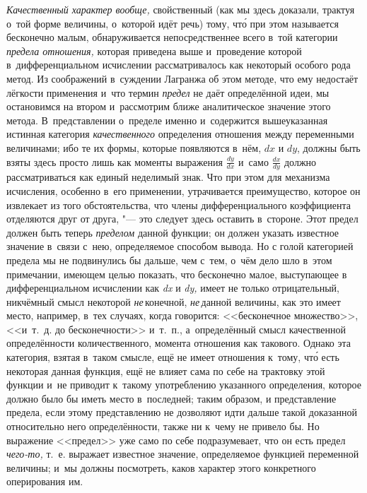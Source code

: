 {\em Качественный характер вообще,} свойственный (как мы здесь доказали,
трактуя о~той форме величины, о~которой идёт речь) тому, чт\'{о} при этом
называется бесконечно малым, обнаруживается непосредственнее всего в~той
категории {\em предела отношения,} которая приведена выше и~проведение которой
в~дифференциальном исчислении рассматривалось как некоторый особого рода метод.
Из соображений в~суждении Лагранжа об этом методе, что ему недостаёт лёгкости
применения и~что термин {\em предел} не даёт определённой идеи, мы
остановимся на втором и~рассмотрим ближе аналитическое значение этого метода.
В~представлении о~пределе именно и~содержится вышеуказанная истинная категория
{\em качественного} определения отношения между переменными величинами; ибо те
их формы, которые появляются в~нём, $dx$ и $dy$, должны быть взяты
здесь просто лишь как моменты выражения $\frac{dy}{dx}$ и~само $\frac{dx}{dy}$
должно рассматриваться как единый неделимый знак. Что при этом для механизма
исчисления, особенно в~его применении, утрачивается преимущество, которое он
извлекает из того обстоятельства, что члены дифференциального коэффициента
отделяются друг от друга, "--- это следует здесь оставить в~стороне. Этот
предел должен быть теперь {\em пределом} данной функции; он должен
указать известное значение в~связи с~нею, определяемое способом вывода. Но с
голой категорией предела мы не подвинулись бы дальше, чем с~тем, о~чём дело шло
в~этом примечании, имеющем целью показать, что бесконечно малое, выступающее в
дифференциальном исчислении как {\em dx} и {\em dy,} имеет не только
отрицательный, никчёмный смысл некоторой {\em не}\,конечной, {\em не}\,данной
величины, как это имеет место, например, в~тех случаях, когда говорится:
<<бесконечное множество>>, <<и~т.~д. до бесконечности>> и~т.~п., а~определённый
смысл качественной определённости количественного, момента отношения как
такового. Однако эта категория, взятая в~таком смысле, ещё не имеет отношения
к~тому, чт\'{о} есть некоторая данная функция, ещё не влияет сама по себе на
трактовку этой функции и~не приводит к~такому употреблению указанного
определения, которое должно было бы иметь место в~последней; таким образом, и
представление предела, если этому представлению не дозволяют идти дальше такой
доказанной относительно него определённости, также ни к~чему не привело бы. Но
выражение <<предел>> уже само по себе подразумевает, что он есть предел
{\em чего-то,} т.~е. выражает известное значение, определяемое функцией
переменной величины; и~мы должны посмотреть, каков характер этого конкретного
оперирования им.

